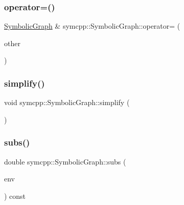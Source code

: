 \mbox{\label{classsymcpp_1_1SymbolicGraph_a3998d4b2e6276d0c9df756fe559c1bb8}} 
\subsubsection{\texorpdfstring{operator=()}{operator=()}}
{\footnotesize\ttfamily \mbox{\hyperlink{classsymcpp_1_1SymbolicGraph}{Symbolic\+Graph}} \& symcpp\+::\+Symbolic\+Graph\+::operator= (\begin{DoxyParamCaption}\item[{const \mbox{\hyperlink{classsymcpp_1_1SymbolicGraph}{Symbolic\+Graph}} \&}]{other }\end{DoxyParamCaption})}

\mbox{\label{classsymcpp_1_1SymbolicGraph_a1dd59d66d6015e65a8c3188d452543e3}} 
\subsubsection{\texorpdfstring{simplify()}{simplify()}}
{\footnotesize\ttfamily void symcpp\+::\+Symbolic\+Graph\+::simplify (\begin{DoxyParamCaption}{ }\end{DoxyParamCaption})}

\mbox{\label{classsymcpp_1_1SymbolicGraph_a89fa31b12b4765fdc24e9cc87cc48742}} 
\subsubsection{\texorpdfstring{subs()}{subs()}}
{\footnotesize\ttfamily double symcpp\+::\+Symbolic\+Graph\+::subs (\begin{DoxyParamCaption}\item[{const std\+::unordered\+\_\+map$<$ std\+::string, double $>$ \&}]{env }\end{DoxyParamCaption}) const}



